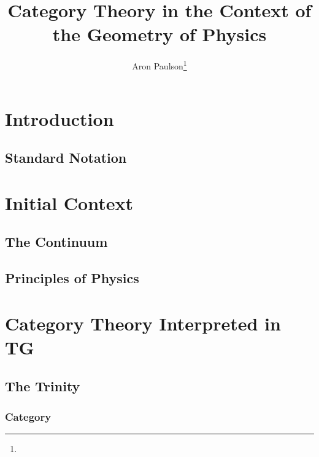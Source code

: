 \documentclass[a4paper,11pt,psamsfonts,reqno]{amsbook}
\newcounter{prpcounter}
\theoremstyle{proposition}
\theoremstyle{proof}
\begin{document}
\title{Category Theory in the Context of the Geometry of Physics}
\author{Aron Paulson\footnote{\datename{ \today}}}
\maketitle
\tableofcontents







\chapter{Introduction}
\label{chap:intro}



\section{Standard Notation}
\label{sec:notation}




\chapter{Initial Context}
\label{chap:initcontext}



\section{The Continuum}
\label{sec:continuum}



\section{Principles of Physics}
\label{sec:princphy}




\chapter{Category Theory Interpreted in TG}
\label{chap:cattg}



\section{The Trinity}
\label{sec:trinity}


\subsection{Category}
\label{sec:cat}

\end{document}
